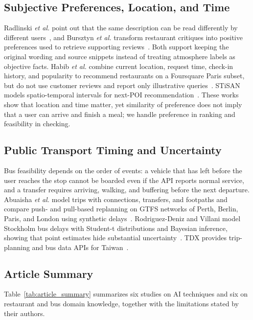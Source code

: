 \documentclass[conference]{IEEEtran}
\begin{document}
\subsection{Subjective Preferences, Location, and Time}
Radlinski \emph{et al.} point out that the same description can be read differently by different users~\cite{subjective_attributes}, and Bursztyn \emph{et al.} transform restaurant critiques into positive preferences used to retrieve supporting reviews~\cite{critique_preference}. Both support keeping the original wording and source snippets instead of treating atmosphere labels as objective facts. Habib \emph{et al.} combine current location, request time, check-in history, and popularity to recommend restaurants on a Foursquare Paris subset, but do not use customer reviews and report only illustrative queries~\cite{restaurant_habib}. STiSAN models spatio-temporal intervals for next-POI recommendation~\cite{poi_stisan}. These works show that location and time matter, yet similarity of preference does not imply that a user can arrive and finish a meal; we handle preference in ranking and feasibility in checking.

\subsection{Public Transport Timing and Uncertainty}
Bus feasibility depends on the order of events: a vehicle that has left before the user reaches the stop cannot be boarded even if the API reports normal service, and a transfer requires arriving, walking, and buffering before the next departure. Abuaisha \emph{et al.} model trips with connections, transfers, and footpaths and compare push- and pull-based replanning on GTFS networks of Perth, Berlin, Paris, and London using synthetic delays~\cite{bus_dynamic_replanning}. Rodriguez-Deniz and Villani model Stockholm bus delays with Student-t distributions and Bayesian inference, showing that point estimates hide substantial uncertainty~\cite{bus_delay_uncertainty}. TDX provides trip-planning and bus data APIs for Taiwan~\cite{tdx_planner,tdx_bus}.

\subsection{Article Summary}
Table~\ref{tab:article_summary} summarizes six studies on AI techniques and six on restaurant and bus domain knowledge, together with the limitations stated by their authors.
\end{document}
